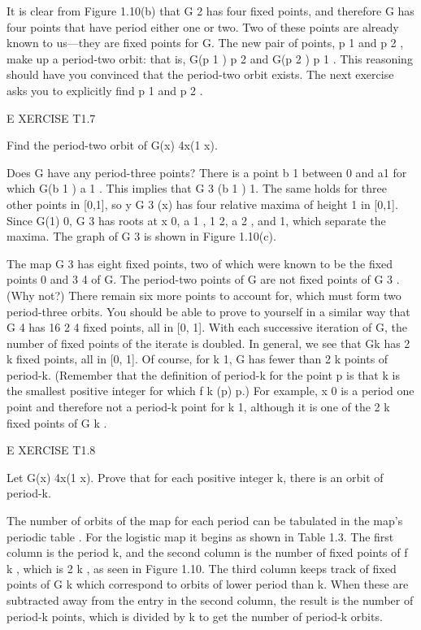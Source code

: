 \documentclass[12pt]{article}
\begin{document}
It is clear from Figure 1.10(b) that G 2 has four fixed points, and therefore G has four points that have 
period either one or two. Two of these points are already known to us—they are fixed points for G. The new 
pair of points, p 1 and p 2 , make up a period-two orbit: that is, G(p 1 )  p 2 and G(p 2 )  p 1 . This 
reasoning should have you convinced that the period-two orbit exists. The next exercise asks you to 
explicitly find p 1 and p 2 .

 

E XERCISE T1.7

Find the period-two orbit of G(x)  4x(1  x).

Does G have any period-three points? There is a point b 1 between 0 and a1  for which G(b 1 )  a 1 . This 
implies that G 3 (b 1 )  1. The same holds for three other points in [0,1], so y  G 3 (x) has four relative 
maxima of height 1 in [0,1]. Since G(1)  0, G 3 has roots at x  0, a 1 , 1  2, a 2 , and 1, which separate 
the maxima. The graph of G 3 is shown in Figure 1.10(c).

The map G 3 has eight fixed points, two of which were known to be the fixed points 0 and 3  4 of G. The 
period-two points of G are not fixed points of G 3 . (Why not?) There remain six more points to account 
for, which must form two period-three orbits. You should be able to prove to yourself in a similar way that 
G 4 has 16  2 4 fixed points, all in [0, 1]. With each successive iteration of G, the number of fixed 
points of the iterate is doubled. In general, we see that Gk  has 2 k fixed points, all in [0, 1]. Of 
course, for k 
 1, G has fewer than 2 k points of period-k. (Remember that the definition of period-k for the point p is 
that k is the smallest positive integer for which f k (p)  p.) For example, x  0 is a period one point and 
therefore not a period-k point for k 
 1, although it is one of the 2 k fixed points of G k .

 

E XERCISE T1.8

Let G(x)  4x(1  x). Prove that for each positive integer k, there is an orbit of period-k.


The number of orbits of the map for each period can be tabulated in the map’s periodic table . For the 
logistic map it begins as shown in Table 1.3. The first column is the period k, and the second column is 
the number of fixed points of f k , which is 2 k , as seen in Figure 1.10. The third column keeps track of 
fixed points of G k which correspond to orbits of lower period than k. When these are subtracted away from 
the entry in the second column, the result is the number of period-k points, which is divided by k to get 
the number of period-k orbits.
\end{document}
